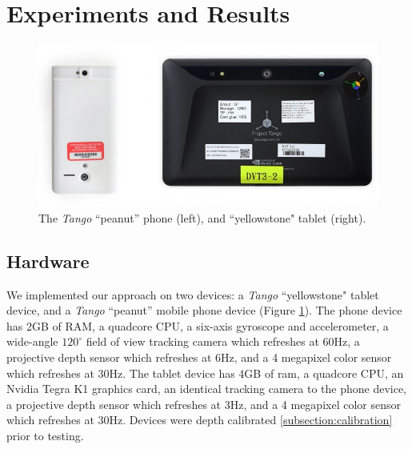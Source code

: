 \section{Experiments and Results}
\begin{figure}
  \centering
    \includegraphics[width=1.0\columnwidth]{img/devices}
      \caption{The \textit{Tango}\cite{Tango} ``peanut'' phone (left), and
      ``yellowstone" tablet (right).}
  \label{fig:devices}
\end{figure}

\subsection{Hardware}
We implemented our approach on two devices: a \textit{Tango}
``yellowstone" tablet device, and a \textit{Tango} ``peanut'' mobile phone
device (Figure \ref{fig:devices}). The phone device has 2GB of RAM, a quadcore
CPU, a six-axis gyroscope and accelerometer, a wide-angle $120^\circ$ field of
view tracking camera which refreshes at 60Hz, a projective depth sensor which
refreshes at 6Hz, and a 4 megapixel color sensor which refreshes at 30Hz. The
tablet device has 4GB of ram, a quadcore CPU, an Nvidia Tegra K1 graphics card,
an identical tracking camera to the phone device, a projective depth sensor
which refreshes at 3Hz, and a 4 megapixel color sensor which refreshes at 30Hz.
Devices were depth calibrated \ref{subsection:calibration} prior to testing. 

